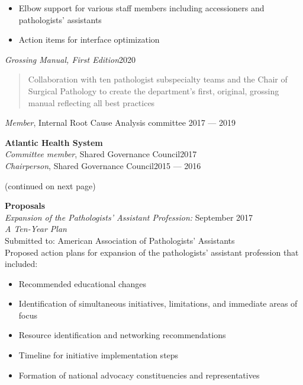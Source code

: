 \documentclass[margin]{res}
\begin{document}
\begin{resume}
\begin{itemize}
\begin{quote}
\begin{itemize}
\end{itemize}
\end{quote}
\item Elbow support for various staff members including accessioners and pathologists’ assistants
\item Action items for interface optimization
\end{itemize}
\emph{Grossing Manual, First Edition}\hfill 2020
\begin{quote}
    Collaboration with ten pathologist subspecialty teams and the Chair of Surgical Pathology to create the department’s first, original, grossing manual reflecting all best practices
\end{quote}
\emph{Member}, Internal Root Cause Analysis committee \hfill 2017 --- 2019
\par
\textbf{Atlantic Health System} \\
\emph{Committee member}, Shared Governance Council\hfill 2017\\
\emph{Chairperson}, Shared Governance Council\hfill 2015 --- 2016
\par
\par
(continued on next page)\\
\par
\pagebreak
\textbf{Proposals}\\
\emph{Expansion of the Pathologists’ Assistant Profession:} \hfill September 2017\\
\emph{ A Ten-Year Plan}\\
Submitted to: American Association of Pathologists’ Assistants\\
Proposed action plans for expansion of the pathologists’ assistant profession that\\included:
\begin{itemize}
\item Recommended educational changes
\item Identification of simultaneous initiatives, limitations, and immediate areas of \\focus 
\item Resource identification and networking recommendations
\item Timeline for initiative implementation steps
\item Formation of national advocacy constituencies and representatives


\end{itemize}
\end{resume}
\end{document}
